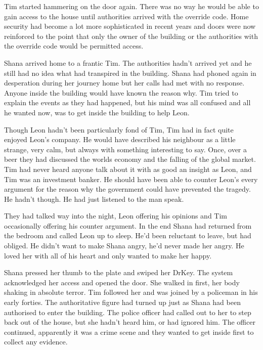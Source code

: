 Tim started hammering on the door again.  There was no way he would be able to gain access to the house until authorities arrived with the override code.  Home security had become a lot more sophisticated in recent years and doors were now reinforced to the point that only the owner of the building or the authorities with the override code would be permitted access.



\thoughtbreak



Shana arrived home to a frantic Tim.  The authorities hadn't arrived yet and he still had no idea what had transpired in the building.  Shana had phoned again in desperation during her journey home but her calls had met with no response.  Anyone inside the building would have known the reason why.  Tim tried to explain the events as they had happened, but his mind was all confused and all he wanted now, was to get inside the building to help Leon.  



\thoughtbreak



Though Leon hadn't been particularly fond of Tim, Tim had in fact quite enjoyed Leon's company.  He would have described his neighbour as a little strange, very calm, but always with something interesting to say.  Once, over a beer they had discussed the worlds economy and the falling of the global market.  Tim had never heard anyone talk about it with as good an insight as Leon, and Tim was an investment banker.  He should have been able to counter Leon's every argument for the reason why the government could have prevented the tragedy.  He hadn't though.  He had just listened to the man speak.  

They had talked way into the night, Leon offering his opinions and Tim occasionally offering his counter argument.  In the end Shana had returned from the bedroom and called Leon up to sleep.  He'd been reluctant to leave, but had obliged.  He didn't want to make Shana angry, he'd never made her angry.  He loved her with all of his heart and only wanted to make her happy.



\thoughtbreak



Shana pressed her thumb to the plate and swiped her DrKey.  The system acknowledged her access and opened the door.  She walked in first, her body shaking in absolute terror.  Tim followed her and was joined by a policeman in his early forties.  The authoritative figure had turned up just as Shana had been authorised to enter the building.  The police officer had called out to her to step back out of the house, but she hadn't heard him, or had ignored him.  The officer continued, apparently it was a crime scene and they wanted to get inside first to collect any evidence.  

